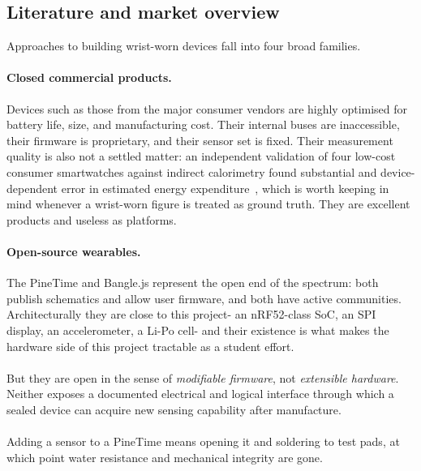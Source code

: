 \documentclass[12pt, a4paper]{article}
\begin{document}
\subsection{Literature and market overview}
\label{sec:lit}

Approaches to building wrist-worn devices fall into four broad families.

\paragraph{Closed commercial products.} Devices such as those from the major
consumer vendors are highly optimised for battery life, size, and manufacturing
cost. Their internal buses are inaccessible, their firmware is proprietary, and
their sensor set is fixed. Their measurement quality is also not a settled
matter: an independent validation of four low-cost consumer smartwatches against
indirect calorimetry found substantial and device-dependent error in estimated
energy expenditure~\cite{liu2025}, which is worth keeping in mind whenever a
wrist-worn figure is treated as ground truth. They are excellent products and
useless as platforms.

\paragraph{Open-source wearables.} The PineTime and Bangle.js represent the
open end of the spectrum: both publish schematics and allow user firmware, and
both have active communities. Architecturally they are close to this project-
an nRF52-class SoC, an SPI display, an accelerometer, a Li-Po cell- and their
existence is what makes the hardware side of this project tractable as a student
effort.\\\\
But they are open in the sense of \emph{modifiable firmware}, not
\emph{extensible hardware}. Neither exposes a documented electrical and logical
interface through which a sealed device can acquire new sensing capability
after manufacture.\\\\
Adding a sensor to a PineTime means opening it and soldering
to test pads, at which point water resistance and mechanical integrity are gone.
\end{document}
